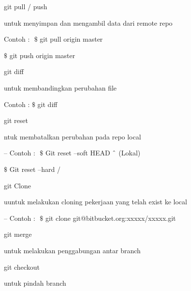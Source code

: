 \vspace{12pt}
\noindent 
git pull / push \par
\noindent 
\vspace{\baselineskip}
untuk menyimpan dan mengambil data dari remote repo \par
\noindent 
\vspace{\baselineskip}
Contoh : $  $ $  \$  $ git pull origin master \par
\noindent 
\vspace{\baselineskip}
 $  \$  $ git push origin master \par
\vspace{12pt}
\noindent 
git diff $  $ \par
\noindent 
\vspace{\baselineskip}
untuk membandingkan perubahan file \par
\noindent 
\vspace{\baselineskip}
Contoh :  $  \$  $ git diff \par
\noindent 
\vspace{\baselineskip}
git reset \par
\noindent 
\vspace{\baselineskip}
ntuk membatalkan perubahan pada repo local \par
\noindent 
\vspace{\baselineskip}
– Contoh : 
$  $ $  \$  $ Git reset --soft HEAD $  \string^  $ (Lokal) \par
\noindent 
\vspace{\baselineskip}
 $  \$  $ Git reset --hard / \par
\vspace{12pt}
\noindent 
git Clone \par
\noindent 
\vspace{\baselineskip}
uuntuk melakukan cloning pekerjaan yang telah exist ke local \par
\noindent 
\vspace{\baselineskip}
– Contoh : $  $ $  \$  $ git clone git@bitbucket.org:xxxxx/xxxxx.git \par
\vspace{12pt}
\noindent 
git merge $  $ \par
\noindent 
\vspace{\baselineskip}
untuk melakukan penggabungan antar branch \par
\vspace{12pt}
\noindent 
git checkout $  $ \par
\noindent 
\vspace{\baselineskip}
untuk pindah branch \par
\vspace{12pt}
\vspace{12pt}

